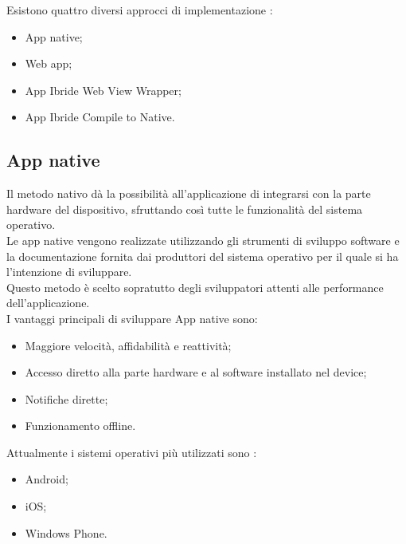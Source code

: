 \newpage

Esistono quattro diversi approcci di implementazione \cite{differenza,sviluppo,apptonative}: 
\begin{itemize}
	\item App native; 
	\item Web app; 
	\item App Ibride Web View Wrapper; 
	\item App Ibride Compile to Native.
\end{itemize}

\subsection{App native}
Il metodo nativo \cite{differenza,apptonative} dà la possibilità all'applicazione di integrarsi con la parte hardware del dispositivo, sfruttando così tutte le funzionalità del sistema operativo. \\
Le app native vengono realizzate utilizzando gli strumenti di sviluppo software e la documentazione fornita dai produttori del sistema operativo per il quale si ha l'intenzione di sviluppare.\\
Questo metodo è scelto sopratutto degli sviluppatori attenti alle performance dell'applicazione.\\
I vantaggi principali di sviluppare App native sono:
\begin{itemize}
	\item Maggiore velocità, affidabilità e reattività;
	\item Accesso diretto alla parte hardware e al software installato nel device; 
	\item Notifiche dirette;
	\item Funzionamento offline.
\end{itemize}
Attualmente i sistemi operativi più utilizzati sono \cite{sviluppo}:
\begin{itemize}
	\item Android; 
	\item iOS; 
	\item Windows Phone.\\
\end{itemize}

